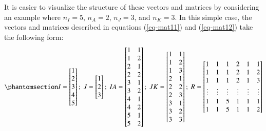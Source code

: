 \documentclass[
  authoryear,
  review,
  1p]{elsarticle}
\begin{document}
It is easier to visualize the structure of these vectors and matrices by
considering an example where \(n_{I} = 5\), \(n_{A} = 2\),
\(n_{J} = 3\), and \(n_{K} = 3\). In this simple case, the vectors and
matrices described in equations (\ref{eq-mat11}) and (\ref{eq-mat12})
take the following form:
\begin{equation}\phantomsection\label{eq-mat13}{
I = \begin{bmatrix}
1 \\
2 \\
3 \\
4 \\
5 \\
\end{bmatrix} ; \;
J = \begin{bmatrix}
1 \\
2 \\
3 \\
\end{bmatrix} ; \;
IA = \begin{bmatrix}
1 & 1 \\
1 & 2 \\
2 & 1 \\
2 & 2 \\
3 & 1 \\
3 & 2 \\
4 & 1 \\
4 & 2 \\
5 & 1 \\
5 & 2 \\
\end{bmatrix} ; \;
JK = \begin{bmatrix}
1 & 1 \\
1 & 2 \\
1 & 3 \\
2 & 1 \\
2 & 2 \\
2 & 3 \\
3 & 1 \\
3 & 2 \\
3 & 3 \\
\end{bmatrix} ; \;
R = \begin{bmatrix}
1 & 1 & 1 & 2 & 1 & 1 \\
1 & 1 & 1 & 2 & 1 & 2 \\
1 & 1 & 1 & 2 & 1 & 3 \\
\vdots & \vdots & \vdots & \vdots & \vdots & \vdots\\
1 & 1 & 5 & 1 & 1 & 1 \\
1 & 1 & 5 & 1 & 1 & 2 \\

\end{bmatrix}}
\end{equation}
\end{document}
